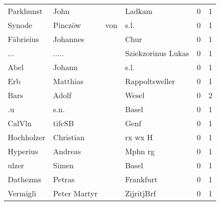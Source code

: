 \begin{tabular}{llllrr}
                Parkhunst &                               John &             &                                      Ladkam &          0 &         1 \\
                   Synode &                            Pinczöw &         von &                                        s.l. &          0 &         1 \\
                Fäbrieius &                           Johannes &             &                                        Chur &          0 &         1 \\
                      ... &                              ..... &             &                          Sziekzorinus Lukas &          0 &         1 \\
                     Abel &                             Johann &             &                                        s.l. &          0 &         1 \\
                      Erb &                           Matthias &             &                              Rappoltsweller &          0 &         1 \\
                     Bars &                              Adolf &             &                                       Wesel &          0 &         2 \\
                       .u &                               s.n. &             &                                       Basel &          0 &         1 \\
                   CalVln &                             tifcSB &             &                                        Genf &          0 &         1 \\
               Hochholzer &                          Christian &             &                                     rx wx H &          0 &         1 \\
                 Hyperius &                            Andreas &             &                                     Mphn rg &          0 &         1 \\
                    ulzer &                              Simen &             &                                       Basel &          0 &         1 \\
                 Dathezms &                             Petras &             &                                   Frankfurt &          0 &         1 \\
                 Vermigli &                       Peter Martyr &             &                                  ZijritjBrf &          0 &         1 \\

\end{tabular}

